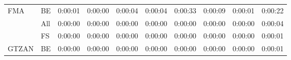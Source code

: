 \begin{table}[H]
{\begin{tabular}{llllllllll}
    \multirow{-3}{*}{FMA}   & \multicolumn{1}{l|}{\cellcolor[HTML]{EFEFEF}BE}  & \cellcolor[HTML]{EFEFEF}0:00:01 & \cellcolor[HTML]{EFEFEF}0:00:00 & \cellcolor[HTML]{EFEFEF}0:00:04 & \cellcolor[HTML]{EFEFEF}0:00:04 & \cellcolor[HTML]{EFEFEF}0:00:33 & \cellcolor[HTML]{EFEFEF}0:00:09 & \cellcolor[HTML]{EFEFEF}0:00:01 & \cellcolor[HTML]{EFEFEF}0:00:22 \\ \cline{1-2}
                            & \multicolumn{1}{l|}{All}                         & 0:00:00                         & 0:00:00                         & 0:00:00                         & 0:00:00                         & 0:00:00                         & 0:00:00                         & 0:00:00                         & 0:00:04                         \\
                            & \multicolumn{1}{l|}{\cellcolor[HTML]{EFEFEF}FS}  & \cellcolor[HTML]{EFEFEF}0:00:00 & \cellcolor[HTML]{EFEFEF}0:00:00 & \cellcolor[HTML]{EFEFEF}0:00:00 & \cellcolor[HTML]{EFEFEF}0:00:00 & \cellcolor[HTML]{EFEFEF}0:00:00 & \cellcolor[HTML]{EFEFEF}0:00:00 & \cellcolor[HTML]{EFEFEF}0:00:00 & \cellcolor[HTML]{EFEFEF}0:00:01 \\
    \multirow{-3}{*}{GTZAN} & \multicolumn{1}{l|}{BE}                          & 0:00:00                         & 0:00:00                         & 0:00:00                         & 0:00:00                         & 0:00:00                         & 0:00:00                         & 0:00:00                         & 0:00:01                        
    \end{tabular}}
\end{table}

